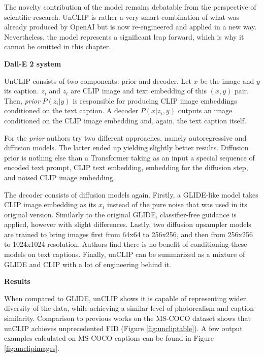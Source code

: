 \documentclass[
]{krantz}
\begin{document}
The novelty contribution of the model remains debatable from the perspective of scientific research. UnCLIP is rather a very smart combination of what was already produced by OpenAI but is now re-engineered and applied in a new way. Nevertheless, the model represents a significant leap forward, which is why it cannot be omitted in this chapter.

\textbf{Dall-E 2 system}

UnCLIP consists of two components: prior and decoder. Let \(x\) be the image and \(y\) its caption. \(z_{i}\) and \(z_{t}\) are CLIP image and text embedding of this \((x, y)\) pair. Then, \emph{prior} \(P(z_{i}|y)\) is responsible for producing CLIP image embeddings conditioned on the text caption. A decoder \(P(x|z_{i},y)\) outputs an image conditioned on the CLIP image embedding and, again, the text caption itself.

For the \emph{prior} authors try two different approaches, namely autoregressive and diffusion models. The latter ended up yielding slightly better results. Diffusion prior is nothing else than a Transformer taking as an input a special sequence of encoded text prompt, CLIP text embedding, embedding for the diffusion step, and noised CLIP image embedding.

The decoder consists of diffusion models again. Firstly, a GLIDE-like model takes CLIP image embedding as its \(x_{t}\) instead of the pure noise that was used in its original version. Similarly to the original GLIDE, classifier-free guidance is applied, however with slight differences. Lastly, two diffusion upsampler models are trained to bring images first from 64x64 to 256x256, and then from 256x256 to 1024x1024 resolution. Authors find there is no benefit of conditioning these models on text captions. Finally, unCLIP can be summarized as a mixture of GLIDE and CLIP with a lot of engineering behind it.

\textbf{Results}

When compared to GLIDE, unCLIP shows it is capable of representing wider diversity of the data, while achieving a similar level of photorealism and caption similarity. Comparison to previous works on the MS-COCO dataset shows that unCLIP achieves unprecedented FID (Figure \ref{fig:uncliptable}). A few output examples calculated on MS-COCO captions can be found in Figure \ref{fig:unclipimages}.
\end{document}
